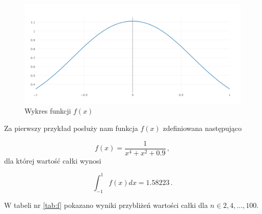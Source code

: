 \documentclass{article}
\begin{document}
    \begin{figure}
      \includegraphics[width=\linewidth]{fplot.png}
      \caption{Wykres funkcji $f(x)$}
      \label{fig:fplot}
    \end{figure}

    Za pierwszy przykład posłuży nam funkcja $f(x)$ zdefiniowana następująco

    \begin{equation*}
      f(x) = \frac{1}{x^4 + x^2 + 0.9}\,,
    \end{equation*}
    dla której wartość całki wynosi

    \begin{equation*}
      \int_{-1}^{1} f(x)dx = 1.58223 \,.
    \end{equation*}

    W tabeli nr \ref{tab:f} pokazano wyniki przybliżeń wartości całki dla $n \in {2, 4, ..., 100}$.
\end{document}
